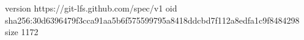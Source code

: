 version https://git-lfs.github.com/spec/v1
oid sha256:30d6396479f3cca91aa5b6f575599795a8418ddcbd7f112a8edfa1c9f8484298
size 1172

